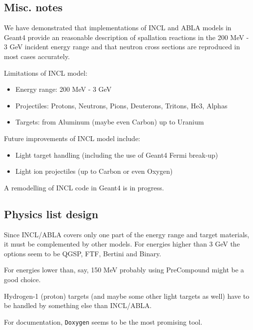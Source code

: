 \begin{appendix}
\section{Misc. notes}
We have demonstrated that implementations of INCL and ABLA models in Geant4 provide
an reasonable description of spallation reactions in the 200 MeV - 3 GeV incident energy range 
and that neutron cross sections are reproduced in most cases accurately.



Limitations of INCL model:
\begin{itemize}
\item Energy range: 200 MeV - 3 GeV
\item Projectiles: Protons, Neutrons, Pions, Deuterons, Tritons, He3, Alphas
\item Targets: from Aluminum (maybe even Carbon) up to Uranium
\end{itemize}

Future improvements of INCL model include:
\begin{itemize}
\item Light target handling (including the use of Geant4 Fermi break-up)
\item Light ion projectiles (up to Carbon or even Oxygen)
\end{itemize}


A remodelling of INCL code in Geant4 is in progress.  

\subsection{Physics list design}

Since INCL/ABLA covers only one part of the energy range and target
materials, it must be complemented by other models. For energies higher
than 3 GeV the options seem to be QGSP, FTF, Bertini and Binary.

For energies lower than, say, 150 MeV probably using PreCompound might
be a good choice.

Hydrogen-1 (proton) targets (and maybe some other light targets as
well) have to be handled by something else than INCL/ABLA.

For documentation, {\tt Doxygen} seems to be the most promising tool.



\end{appendix}
